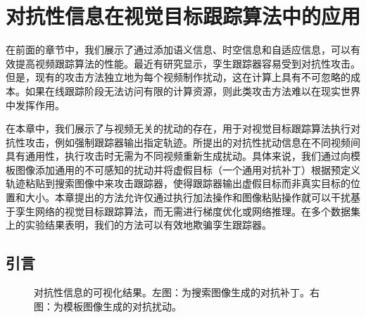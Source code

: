 \chapter{对抗性信息在视觉目标跟踪算法中的应用} \label{chap:attack}
在前面的章节中，我们展示了通过添加语义信息、时空信息和自适应信息，可以有效提高视频跟踪算法的性能。最近有研究显示，孪生跟踪器容易受到对抗性攻击。但是，现有的攻击方法独立地为每个视频制作扰动，这在计算上具有不可忽略的成本。如果在线跟踪阶段无法访问有限的计算资源，则此类攻击方法难以在现实世界中发挥作用。

在本章中，我们展示了与视频无关的扰动的存在，用于对视觉目标跟踪算法执行对抗性攻击，例如强制跟踪器输出指定轨迹。所提出的对抗性扰动信息在不同视频间具有通用性，执行攻击时无需为不同视频重新生成扰动。具体来说，我们通过向模板图像添加通用的不可感知的扰动并将虚假目标（一个通用对抗补丁）根据预定义轨迹粘贴到搜索图像中来攻击跟踪器，使得跟踪器输出虚假目标而非真实目标的位置和大小。本章提出的方法允许仅通过执行加法操作和图像粘贴操作就可以干扰基于孪生网络的视觉目标跟踪算法，而无需进行梯度优化或网络推理。在多个数据集上的实验结果表明，我们的方法可以有效地欺骗孪生跟踪器。

\section{引言}

\begin{figure}[t]
\centering
{} \qquad \qquad 
{}
\caption{对抗性信息的可视化结果。左图：为搜索图像生成的对抗补丁。右图：为模板图像生成的对抗扰动。}
\label{fig:attack}
\end{figure}

